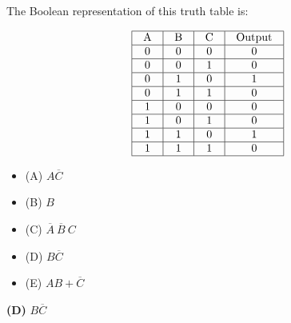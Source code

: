 

The Boolean representation of this truth table is:


$$\vbox{\offinterlineskip
\halign{\strut
\vrule \quad\hfil # \ \hfil & 
\vrule \quad\hfil # \ \hfil & 
\vrule \quad\hfil # \ \hfil & 
\vrule \quad\hfil # \ \hfil \vrule \cr
\noalign{\hrule}
%
A & B & C & Output \cr
%
\noalign{\hrule}
%
0 & 0 & 0 & 0 \cr
%
\noalign{\hrule}
%
0 & 0 & 1 & 0 \cr
%
\noalign{\hrule}
%
0 & 1 & 0 & 1 \cr
%
\noalign{\hrule}
%
0 & 1 & 1 & 0 \cr
%
\noalign{\hrule}
%
1 & 0 & 0 & 0 \cr
%
\noalign{\hrule}
%
1 & 0 & 1 & 0 \cr
%
\noalign{\hrule}
%
1 & 1 & 0 & 1 \cr
%
\noalign{\hrule}
%
1 & 1 & 1 & 0 \cr
%
\noalign{\hrule}
} %
}$$ %

\begin{itemize}
\item{(A)} $A \overline{C}$
\vskip 5pt 
\item{(B)} $B$
\vskip 5pt 
\item{(C)} $\overline{A} \> \overline{B} \> C$
\vskip 5pt 
\item{(D)} $B \overline{C}$
\vskip 5pt 
\item{(E)} $AB + \overline{C}$
\end{itemize}







{\bf (D)} $B \overline{C}$
 










